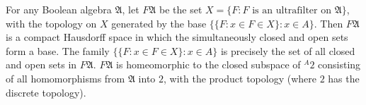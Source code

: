 For any Boolean algebra $\mathfrak{A}$, let $F\mathfrak{A}$ be the set $X = \{F : F \text{ is an ultrafilter on } \mathfrak{A}\}$, with the topology on $X$ generated by the base $\{\{F : x \in F \in X\} : x \in A\}$. Then $F\mathfrak{A}$ is a compact Hausdorff space in which the simultaneously closed and open sets form a base. The family $\{\{F : x \in F \in X\} : x \in A\}$ is precisely the set of all closed and open sets in $F\mathfrak{A}$. $F\mathfrak{A}$ is homeomorphic to the closed subspace of $^{A}2$ consisting of all homomorphisms from $\mathfrak{A}$ into $2$, with the product topology (where $2$ has the discrete topology).
